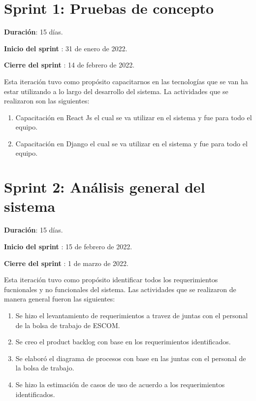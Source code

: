 \section{Sprint 1: Pruebas de concepto}
    \begin{description}
        \item \textbf{Duración}: 15 días.
        \item \textbf{Inicio del sprint }: 31 de enero de 2022.
        \item \textbf{Cierre del sprint }: 14 de febrero de 2022.
    \end{description}

    Esta iteración tuvo como propósito capacitarnos en las tecnologías que se van ha estar utilizando 
    a lo largo del desarrollo del sistema. La actividades que se realizaron son las siguientes:
    \begin{enumerate}
        \item Capacitación en React Js el cual se va utilizar en el sistema y fue para todo el equipo.
        \item Capacitación en Django el cual se va utilizar en el sistema y fue para todo el equipo.
    \end{enumerate}


\section{Sprint 2: Análisis general del sistema}
    \begin{description}
        \item \textbf{Duración}: 15 días.
        \item \textbf{Inicio del sprint }: 15 de febrero de 2022.
        \item \textbf{Cierre del sprint }: 1 de marzo de 2022.
    \end{description}

    Esta iteración tuvo como propósito identificar todos los requerimientos fucnionales y no funcionales del sistema. 
    Las actividades que se realizaron de manera general fueron las siguientes:
    \begin{enumerate}
        \item Se hizo el levantamiento de requerimientos a travez de juntas con el personal de la bolsa de trabajo de ESCOM.
        \item Se creo el product backlog con base en los requerimientos identificados.
        \item Se elaboró el diagrama de procesos con base en las juntas con el personal de la bolsa de trabajo.
        \item Se hizo la estimación de casos de uso de acuerdo a los requerimientos identificados.
    \end{enumerate} 

